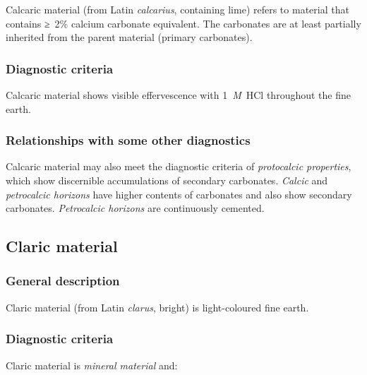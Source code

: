 \documentclass[
  letterpaper,
  DIV=11,
  numbers=noendperiod]{scrreprt}
\begin{document}
Calcaric material (from Latin \emph{calcarius}, containing lime) refers
to material that contains ≥~2\% calcium carbonate equivalent. The
carbonates are at least partially inherited from the parent material
(primary carbonates).

\hypertarget{diagnostic-criteria-59}{%
\subsubsection{Diagnostic criteria}\label{diagnostic-criteria-59}}

Calcaric material shows visible effervescence with 1~\emph{M}~HCl
throughout the fine earth.

\hypertarget{relationships-with-some-other-diagnostics-53}{%
\subsubsection{Relationships with some other
diagnostics}\label{relationships-with-some-other-diagnostics-53}}

Calcaric material may also meet the diagnostic criteria of
\emph{protocalcic properties}, which show discernible accumulations of
secondary carbonates. \emph{Calcic} and \emph{petrocalcic horizons} have
higher contents of carbonates and also show secondary carbonates.
\emph{Petrocalcic horizons} are continuously cemented.

\hypertarget{claric-material}{%
\subsection{Claric material}\label{claric-material}}

\hypertarget{general-description-58}{%
\subsubsection{General description}\label{general-description-58}}

Claric material (from Latin \emph{clarus}, bright) is light-coloured
fine earth.

\hypertarget{diagnostic-criteria-60}{%
\subsubsection{Diagnostic criteria}\label{diagnostic-criteria-60}}

Claric material is \emph{mineral material} and:
\end{document}
